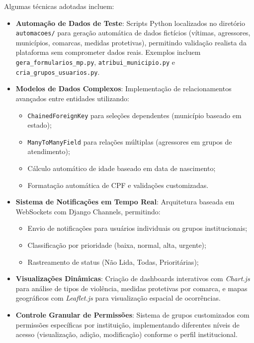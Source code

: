 Algumas técnicas adotadas incluem:
\begin{itemize}
\item \textbf{Automação de Dados de Teste}: Scripts Python localizados no diretório \texttt{automacoes/} para geração automática de dados fictícios (vítimas, agressores, municípios, comarcas, medidas protetivas), permitindo validação realista da plataforma sem comprometer dados reais. Exemplos incluem \texttt{gera\_formularios\_mp.py}, \texttt{atribui\_municipio.py} e \texttt{cria\_grupos\_usuarios.py}.

\item \textbf{Modelos de Dados Complexos}: Implementação de relacionamentos avançados entre entidades utilizando:
   \begin{itemize}
      \item \texttt{ChainedForeignKey} para seleções dependentes (município baseado em estado);
      \item \texttt{ManyToManyField} para relações múltiplas (agressores em grupos de atendimento);
      \item Cálculo automático de idade baseado em data de nascimento;
      \item Formatação automática de CPF e validações customizadas.
   \end{itemize}

\item \textbf{Sistema de Notificações em Tempo Real}: Arquitetura baseada em WebSockets com Django Channels, permitindo:
   \begin{itemize}
      \item Envio de notificações para usuários individuais ou grupos institucionais;
      \item Classificação por prioridade (baixa, normal, alta, urgente);
      \item Rastreamento de status (Não Lida, Todas, Prioritárias); 
   \end{itemize}

\item \textbf{Visualizações Dinâmicas}: Criação de dashboards interativos com \textit{Chart.js} para análise de tipos de violência, medidas protetivas por comarca, e mapas geográficos com \textit{Leaflet.js} para visualização espacial de ocorrências.

\item \textbf{Controle Granular de Permissões}: Sistema de grupos customizados com permissões específicas por instituição, implementando diferentes níveis de acesso (visualização, adição, modificação) conforme o perfil institucional.


\end{itemize}
